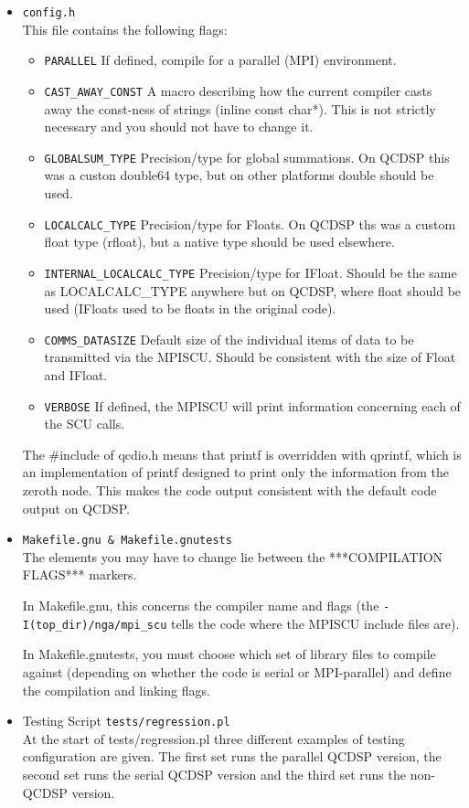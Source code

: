 \documentclass[12pt]{article}
\begin{document}
\begin{itemize}
\item{\tt config.h}\\

This file contains the following flags:
\begin{itemize}
 \item{\tt PARALLEL} If defined, compile for a parallel (MPI) environment.
 \item{\tt CAST\_AWAY\_CONST}  A macro describing how the current compiler casts
                     away the const-ness of strings (inline const
                     char*).  This is not strictly necessary and you
                     should not have to change it.
 \item{\tt GLOBALSUM\_TYPE} Precision/type for global summations.  On QCDSP
 this was a custon double64 type, but on other platforms double should be
 used.
 \item{\tt LOCALCALC\_TYPE} Precision/type for Floats.  On QCDSP ths was a
 custom float type (rfloat), but a native type should be used elsewhere.
 \item{\tt INTERNAL\_LOCALCALC\_TYPE} Precision/type for IFloat.  Should be the
                             same as LOCALCALC\_TYPE anywhere but on
                             QCDSP, where float should be used (IFloats used
			     to be floats in the original code).
 \item{\tt COMMS\_DATASIZE} Default size of the individual items of data to be
                    transmitted via the MPISCU.  Should be consistent
                    with the size of Float and IFloat.
 \item{\tt VERBOSE} If defined, the MPISCU will print information concerning
             each of the SCU calls.
\end{itemize}

The \#include of qcdio.h means that printf is overridden with qprintf,
which is an implementation of printf designed to print only the
information from the zeroth node.  This makes the code output consistent
with the default code output on QCDSP.

\item{\tt Makefile.gnu \& Makefile.gnutests}\\
The elements you may have to change
lie between the ***COMPILATION FLAGS*** markers.  

In Makefile.gnu, this concerns the compiler name and flags (the
{\tt -I(top\_dir)/nga/mpi\_scu} tells the code where the MPISCU include files
are).

In Makefile.gnutests, you must choose which set of library files to
compile against (depending on whether the code is serial or
MPI-parallel) and define the compilation and linking flags.

\item{Testing Script {\tt tests/regression.pl}}\\
At the start of tests/regression.pl three different examples of
testing configuration are given.  The first set runs the parallel
QCDSP version, the second set runs the serial QCDSP version and the
third set runs the non-QCDSP version.  

\end{itemize}
\end{document}
